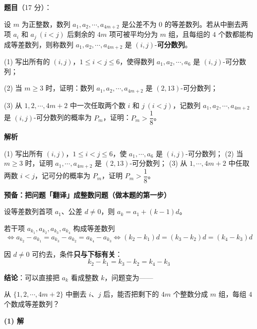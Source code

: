 \begin{answer}

\textbf{题目}（17 分）：

设 $m$ 为正整数，数列 $a_1,a_2,\cdots,a_{4m+2}$ 是公差不为 $0$ 的等差数列。若从中删去两项 $a_i$ 和 $a_j\ (i<j)$ 后剩余的 $4m$ 项可被平均分为 $m$ 组，且每组的 $4$ 个数都能构成等差数列，则称数列 $a_1,a_2,\cdots,a_{4m+2}$ 是 $(i,j)$-\textbf{可分数列}。

  (1) 写出所有的 $(i,j)$，$1\le i<j\le6$，使得数列 $a_1,a_2,\cdots,a_6$ 是 $(i,j)$-可分数列；

  (2) 当 $m\ge3$ 时，证明：数列 $a_1,a_2,\cdots,a_{4m+2}$ 是 $(2,13)$-可分数列；

  (3) 从 $1,2,\cdots,4m+2$ 中一次任取两个数 $i$ 和 $j\ (i<j)$，记数列 $a_1,a_2,\cdots,a_{4m+2}$ 是 $(i,j)$-可分数列的概率为 $P_m$，证明：$P_m>\dfrac18$。

\par\medskip

\textbf{解析}

  (1) 写出所有 $(i,j)$，$1\le i<j\le6$，使 $a_1,\cdots,a_6$ 是 $(i,j)$-可分数列；
  (2) 当 $m\ge3$ 时，证明 $a_1,\cdots,a_{4m+2}$ 是 $(2,13)$-可分数列；
  (3) 从 $1,\cdots,4m+2$ 中任取两数 $i<j$，记可分的概率为 $P_m$，证明 $P_m>\dfrac18$。

\par\medskip

\textbf{预备：把问题「翻译」成整数问题（做本题的第一步）}

设等差数列首项 $a_1$、公差 $d\ne0$，则 $a_k=a_1+(k-1)d$。

若干项 $a_{k_1},a_{k_2},a_{k_3},a_{k_4}$ 构成等差数列
\nopagebreak[4]
\[\iff a_{k_2}-a_{k_1}=a_{k_3}-a_{k_2}=a_{k_4}-a_{k_3}\iff \left(k_2-k_1\right)d=\left(k_3-k_2\right)d=\left(k_4-k_3\right)d\]

因 $d\ne0$ 可约去，条件\textbf{只与下标有关}：
\nopagebreak[4]
\[k_2-k_1=k_3-k_2=k_4-k_3\]

\textbf{结论}：可以直接把 $a_k$ 看成整数 $k$，问题变为——

\begin{gktip}
从 $\{1,2,\cdots,4m+2\}$ 中删去 $i$、$j$ 后，能否把剩下的 $4m$ 个整数分成 $m$ 组，每组 $4$ 个数成等差数列？
\end{gktip}

\par\medskip

\textbf{(1) 解}


\end{answer}
